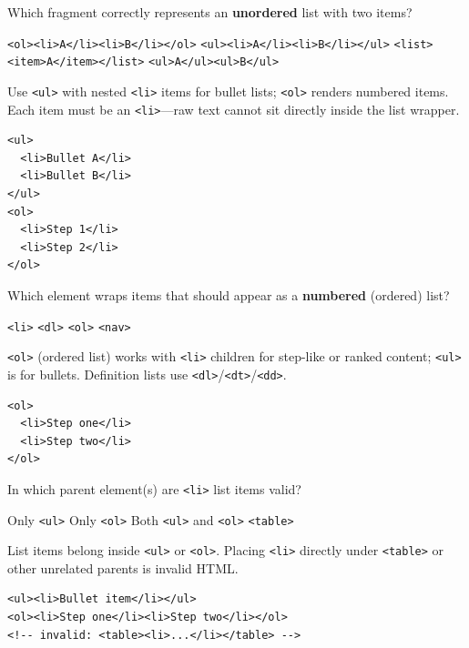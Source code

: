 \question[4]
Which fragment correctly represents an \textbf{unordered} list with two items?
\begin{choices}
  \choice \texttt{<ol><li>A</li><li>B</li></ol>}
  \CorrectChoice \texttt{<ul><li>A</li><li>B</li></ul>}
  \choice \texttt{<list><item>A</item></list>}
  \choice \texttt{<ul>A</ul><ul>B</ul>}
\end{choices}
\begin{solution}
  Use \texttt{<ul>} with nested \texttt{<li>} items for bullet lists; \texttt{<ol>} renders numbered items. Each item must be an \texttt{<li>}---raw text cannot sit directly inside the list wrapper.
\begin{lstlisting}[style=htmlinline]
<ul>
  <li>Bullet A</li>
  <li>Bullet B</li>
</ul>
<ol>
  <li>Step 1</li>
  <li>Step 2</li>
</ol>
\end{lstlisting}
\end{solution}

\question[4]
Which element wraps items that should appear as a \textbf{numbered} (ordered) list?
\begin{choices}
  \choice \texttt{<li>}
  \choice \texttt{<dl>}
  \CorrectChoice \texttt{<ol>}
  \choice \texttt{<nav>}
\end{choices}
\begin{solution}
  \texttt{<ol>} (ordered list) works with \texttt{<li>} children for step-like or ranked content; \texttt{<ul>} is for bullets. Definition lists use \texttt{<dl>}/\texttt{<dt>}/\texttt{<dd>}.
\begin{lstlisting}[style=htmlinline]
<ol>
  <li>Step one</li>
  <li>Step two</li>
</ol>
\end{lstlisting}
\end{solution}

\question[4]
In which parent element(s) are \texttt{<li>} list items valid?
\begin{choices}
  \choice Only \texttt{<ul>}
  \choice Only \texttt{<ol>}
  \CorrectChoice Both \texttt{<ul>} and \texttt{<ol>}
  \choice \texttt{<table>}
\end{choices}
\begin{solution}
  List items belong inside \texttt{<ul>} or \texttt{<ol>}. Placing \texttt{<li>} directly under \texttt{<table>} or other unrelated parents is invalid HTML.
\begin{lstlisting}[style=htmlinline]
<ul><li>Bullet item</li></ul>
<ol><li>Step one</li><li>Step two</li></ol>
<!-- invalid: <table><li>...</li></table> -->
\end{lstlisting}
\end{solution}

